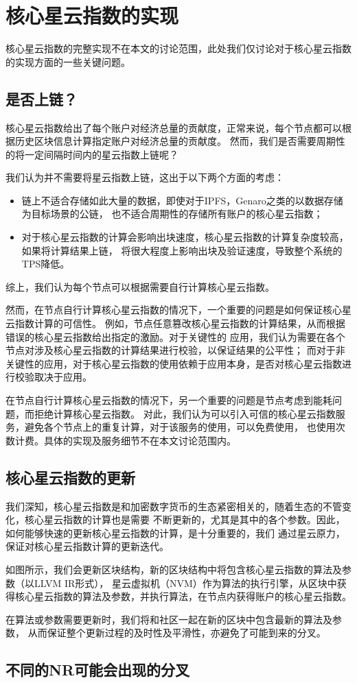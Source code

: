 \section{核心星云指数的实现}
核心星云指数的完整实现不在本文的讨论范围，此处我们仅讨论对于核心星云指数的实现方面的一些关键问题。

\subsection{是否上链？}
核心星云指数给出了每个账户对经济总量的贡献度，正常来说，每个节点都可以根据历史区块信息计算指定账户对经济总量的贡献度。
然而，我们是否需要周期性的将一定间隔时间内的星云指数上链呢？

我们认为并不需要将星云指数上链，这出于以下两个方面的考虑：
\begin{itemize}
\item 链上不适合存储如此大量的数据，即使对于IPFS，Genaro之类的以数据存储为目标场景的公链，
也不适合周期性的存储所有账户的核心星云指数；
\item 对于核心星云指数的计算会影响出块速度，核心星云指数的计算复杂度较高，如果将计算结果上链，
将很大程度上影响出块及验证速度，导致整个系统的TPS降低。
\end{itemize}
\noindent 综上，我们认为每个节点可以根据需要自行计算核心星云指数。

然而，在节点自行计算核心星云指数的情况下，一个重要的问题是如何保证核心星云指数计算的可信性。
例如，节点任意篡改核心星云指数的计算结果，从而根据错误的核心星云指数给出指定的激励。对于关键性的
应用，我们认为需要在各个节点对涉及核心星云指数的计算结果进行校验，以保证结果的公平性；
而对于非关键性的应用，对于核心星云指数的使用依赖于应用本身，是否对核心星云指数进行校验取决于应用。

在节点自行计算核心星云指数的情况下，另一个重要的问题是节点考虑到能耗问题，而拒绝计算核心星云指数。
对此，我们认为可以引入可信的核心星云指数服务，避免各个节点上的重复计算，对于该服务的使用，可以免费使用，
也使用次数计费。具体的实现及服务细节不在本文讨论范围内。

\subsection{核心星云指数的更新}
我们深知，核心星云指数是和加密数字货币的生态紧密相关的，随着生态的不管变化，核心星云指数的计算也是需要
不断更新的，尤其是其中的各个参数。因此，如何能够快速的更新核心星云指数的计算，是十分重要的，我们
通过星云原力，保证对核心星云指数计算的更新迭代。

如图所示，我们会更新区块结构，新的区块结构中将包含核心星云指数的算法及参数（以LLVM IR形式），
星云虚拟机（NVM）作为算法的执行引擎，从区块中获得核心星云指数的算法及参数，并执行算法，在节点内获得账户的核心星云指数。

在算法或参数需要更新时，我们将和社区一起在新的区块中包含最新的算法及参数，
从而保证整个更新过程的及时性及平滑性，亦避免了可能到来的分叉。

\subsection{不同的NR可能会出现的分叉}

